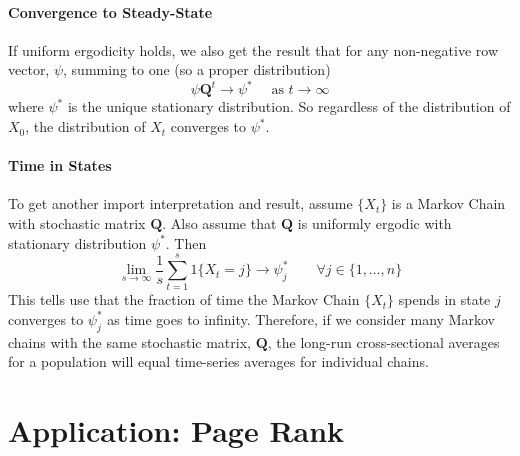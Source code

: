 \documentclass[a4paper,12pt]{scrartcl}
\begin{document}
\paragraph{Convergence to Steady-State}
If uniform ergodicity holds, we also get the result that
for any non-negative row vector, $\psi$, summing to one (so a
proper distribution)
\[ \psi \mathbf{Q}^t \rightarrow \psi^* \quad \text{ as }
	t\rightarrow \infty \]
where $\psi^*$ is the unique stationary distribution. So
regardless of the distribution of $X_0$, the distribution 
of $X_t$ converges to $\psi^*$.

\paragraph{Time in States} To get another import interpretation
and result, assume $\{X_t\}$ is a Markov Chain with stochastic 
matrix $\mathbf{Q}$. Also assume that $\mathbf{Q}$ is 
uniformly ergodic with stationary distribution $\psi^*$. Then
\begin{equation}
    \lim_{s\rightarrow\infty}
    \frac{1}{s} \sum^s_{t=1} 1\{X_t = j\} \rightarrow
	\psi^*_j  \qquad
	\forall j \in \{1, \ldots, n\}
\end{equation}
This tells use that the fraction of time the Markov Chain
$\{X_t\}$ spends in state $j$ converges to $\psi^*_j$ as
time goes to infinity.  Therefore, if we consider many
Markov chains with the same stochastic matrix, $\mathbf{Q}$,
the long-run cross-sectional averages for a population will
equal time-series averages for individual chains.



\newpage
\section{Application: Page Rank}
\end{document}
